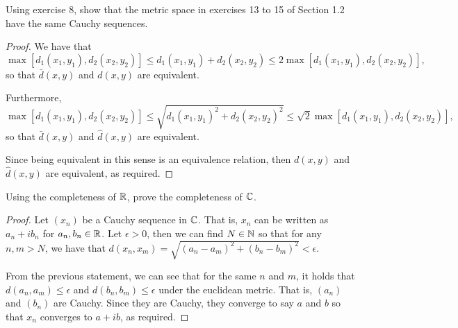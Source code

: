 \begin{exercise}{9}
Using exercise 8, show that the metric space in exercises 13 to 15 of Section 1.2 have the same Cauchy sequences.
\end{exercise}
\begin{proof}
We have that 
\[
\max[d_1(x_1,y_1),d_2(x_2,y_2)]
\leq d_1(x_1,y_1)+d_2(x_2,y_2)
\leq 2\max[d_1(x_1,y_1),d_2(x_2,y_2)],
\]
so that $\bar{d}(x,y)$ and $d(x,y)$ are equivalent.

Furthermore,
\[
\max[d_1(x_1,y_1),d_2(x_2,y_2)]
\leq \sqrt{d_1(x_1,y_1)^2+d_2(x_2,y_2)^2}
\leq \sqrt{2}\max[d_1(x_1,y_1),d_2(x_2,y_2)],
\]
so that $\bar{d}(x,y)$ and $\hat{d}(x,y)$ are equivalent.

Since being equivalent in this sense is an equivalence relation, then $d(x,y)$ and $\hat{d}(x,y)$ are equivalent, as required.
\end{proof}

\begin{exercise}{10}
Using the completeness of $\mathbb{R}$, prove the completeness of $\mathbb{C}$.
\end{exercise}
\begin{proof}
Let $(x_n)$ be a Cauchy sequence in $\mathbb{C}$. That is, $x_n$ can be written as $a_n+ib_n$ for $a_n,b_n\in\mathbb{R}$. Let $\epsilon>0$, then we can find $N\in\mathbb{N}$ so that for any $n,m>N$, we have that $d(x_n,x_m)=\sqrt{(a_n-a_m)^2+(b_n-b_m)^2}<\epsilon$. 

From the previous statement, we can see that for the same $n$ and $m$, it holds that $d(a_n,a_m)\leq \epsilon$ and $d(b_n,b_m)\leq \epsilon$ under the euclidean metric. That is, $(a_n)$ and $(b_n)$ are Cauchy. Since they are Cauchy, they converge to say $a$ and $b$ so that $x_n$ converges to $a+ib$, as required.
\end{proof}
